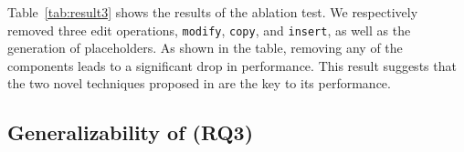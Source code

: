 Table~\ref{tab:result3} shows the results of the ablation test. We respectively removed three edit operations, {\tt modify}, {\tt copy}, and {\tt insert}, as well as the generation of placeholders. As shown in the table, removing any of the components leads to a significant drop in performance. This result suggests that the two novel techniques proposed in \techname are the key to its performance.

\subsection{Generalizability of \techname (RQ3)}

\begin{table}
\vspace{-3mm}
\caption{Comparison on the 420 additional bugs}\vspace{-2mm}
\label{tab:rede2}
\end{table}
